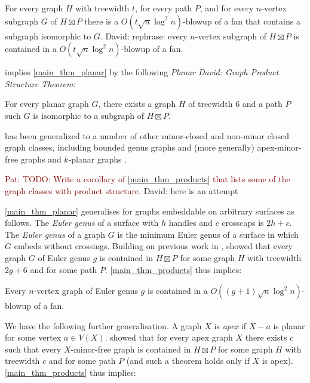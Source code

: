 \documentclass{patmorin}
\newcommand{\david}[1]{{\color{orange} David: #1}}
\newcommand{\pat}[1]{\textcolor{Maroon}{Pat: #1}}
\newcommand{\defin}[1]{\emph{\textcolor{brightmaroon}{#1}}}
\begin{document}
\begin{thm}\label{main_thm_products}
  For every graph $H$ with treewidth $t$, for every path $P$, and for every $n$-vertex subgraph $G$ of $H\boxtimes P$ there is a $O(t\sqrt{n}\log^2 n)$-blowup of a fan that contains a subgraph isomorphic to $G$.
  \david{rephrase: every $n$-vertex subgraph of $H\boxtimes P$ is contained in a $O(t\sqrt{n}\log^2 n)$-blowup of a fan.}
\end{thm}

 implies \cref{main_thm_planar} by the following \defin{Planar \david{Graph} Product Structure Theorem}:

\begin{thm}\label{planar_product_structure}
  For every planar graph $G$, there exists a graph $H$ of treewidth $6$ and a path $P$ such $G$ is isomorphic to a subgraph of $H\boxtimes P$.
\end{thm}

 has been generalized to a number of other minor-closed and non-minor closed graph classes, including bounded genus graphs and (more generally) apex-minor-free graphs \cite{dujmovic.joret.ea:planar,distel.hickingbotham.ea:improved} and $k$-planar graphs \cite{dujmovic.morin.ea:graph,distel.hickingbotham.ea:powers}.

\pat{TODO: Write a corollary of \cref{main_thm_products} that lists some of the graph classes with product structure.} \david{here is an attempt}

\cref{main_thm_planar} generalises for graphs embeddable on arbitrary surfaces as follows. The \defin{Euler genus} of a surface with $h$ handles and $c$ crosscaps is $2h+c$. The \defin{Euler genus} of a graph $G$ is the minimum Euler genus of a surface in which $G$ embeds without crossings.
Building on previous work in \citep{dujmovic.joret.ea:planar,ueckerdt.wood.ea:improved}, \citet{distel.hickingbotham.ea:improved} showed that every graph $G$ of Euler genus $g$ is contained in $H\boxtimes P$ for some graph $H$ with treewidth $2g+6$ and for some path $P$. \cref{main_thm_products} thus implies:

\begin{thm}\label{genus_products}
Every $n$-vertex graph of Euler genus $g$ is contained in a $O((g+1)\sqrt{n}\log^2 n)$-blowup of a fan.
\end{thm}

We have the following further generalisation.
A graph $X$ is \defin{apex} if $X-a$ is planar for some vertex $a\in V(X)$. \citet{dujmovic.joret.ea:planar} showed that for every apex graph $X$ there exists $c$ such that every $X$-minor-free graph is contained in $H\boxtimes P$ for some graph $H$ with treewidth $c$ and for some path $P$ (and such a theorem holds only if $X$ is apex). \cref{main_thm_products} thus implies:
\end{document}
